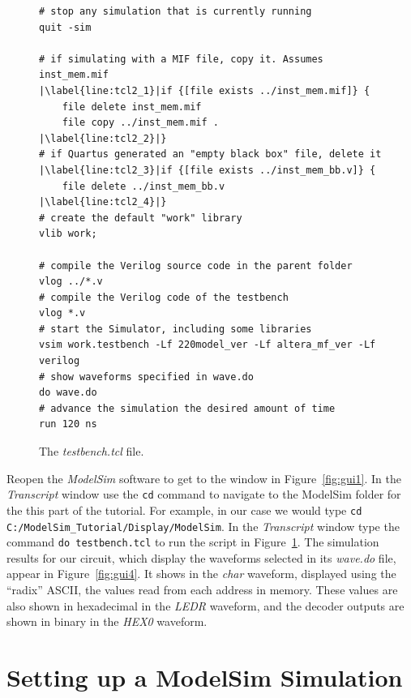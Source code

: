 \documentclass[11pt, twoside, pdftex]{article}
\begin{document}
\lstset{language=Tcl,numbers=left,escapechar=|}
\begin{figure}[b!]
\begin{center}
\begin{minipage}[t]{15 cm}
\begin{lstlisting}[name=tcl2]
# stop any simulation that is currently running
quit -sim

# if simulating with a MIF file, copy it. Assumes inst_mem.mif
|\label{line:tcl2_1}|if {[file exists ../inst_mem.mif]} {
	file delete inst_mem.mif
	file copy ../inst_mem.mif .
|\label{line:tcl2_2}|}
# if Quartus generated an "empty black box" file, delete it
|\label{line:tcl2_3}|if {[file exists ../inst_mem_bb.v]} {
	file delete ../inst_mem_bb.v
|\label{line:tcl2_4}|}
# create the default "work" library
vlib work;

# compile the Verilog source code in the parent folder
vlog ../*.v
# compile the Verilog code of the testbench
vlog *.v
# start the Simulator, including some libraries
vsim work.testbench -Lf 220model_ver -Lf altera_mf_ver -Lf verilog
# show waveforms specified in wave.do
do wave.do
# advance the simulation the desired amount of time
run 120 ns
\end{lstlisting}
\end{minipage}
\caption{The {\it testbench.tcl} file.}
\label{fig:tcl2}
\end{center}
\end{figure}

\noindent
Reopen the {\it ModelSim} software to get to the window in Figure~\ref{fig:gui1}.
In the {\it Transcript} window use the \texttt{cd} command to navigate to the 
ModelSim folder for the this part of the tutorial. For example, in our 
case we would type \texttt{cd C:/ModelSim\_Tutorial/Display/ModelSim}. 
In the {\it Transcript} window type the command \texttt{do testbench.tcl} to run
the script in Figure~\ref{fig:tcl2}.
The simulation results for our circuit, which display the waveforms selected in its
{\it wave.do} file, appear in Figure~\ref{fig:gui4}. It shows in the {\it char} 
waveform, displayed using the ``radix'' ASCII, the values read from each address in memory.
These values are also shown in hexadecimal in the {\it LEDR} waveform, and the 
decoder outputs are shown in binary in the {\it HEX0} waveform.

\section{Setting up a ModelSim Simulation}
\end{document}
